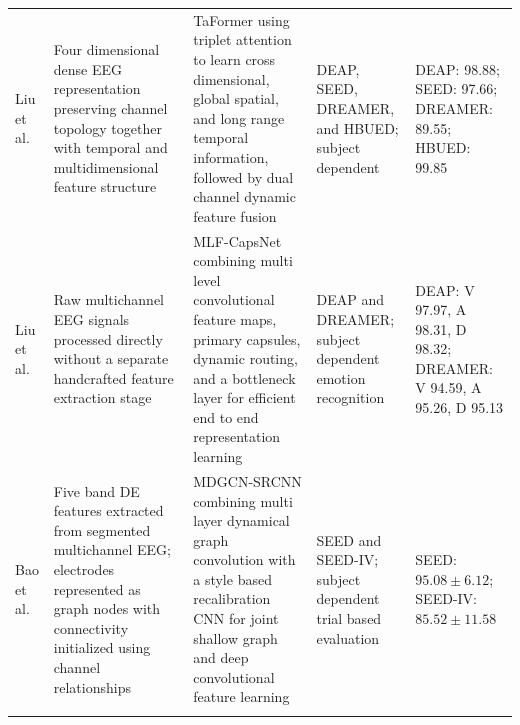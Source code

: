 \documentclass[ASNA,twocolumn]{USG}
\newcommand{\lightrowsep}{%
  \arrayrulecolor{lightrowgray}%
  \specialrule{0.30pt}{3.5pt}{3.5pt}%
  \arrayrulecolor{black}%
}
\begin{document}
\begin{table}
\begin{tabularx}{\textheight}{
>{\raggedright\arraybackslash}p{3.15cm}
>{\raggedright\arraybackslash}X
>{\raggedright\arraybackslash}X
>{\raggedright\arraybackslash}p{3.65cm}
>{\raggedright\arraybackslash}p{5.15cm}}
\lightrowsep

Liu et al. \cite{liu2026taformer} &
Four dimensional dense EEG representation preserving channel topology
together with temporal and multidimensional feature structure &
TaFormer using triplet attention to learn cross dimensional,
global spatial, and long range temporal information,
followed by dual channel dynamic feature fusion &
DEAP, SEED, DREAMER, and HBUED; subject dependent &
DEAP: 98.88;
SEED: 97.66;
DREAMER: 89.55;
HBUED: 99.85 \\

\lightrowsep

Liu et al. \cite{liu2020multi} &
Raw multichannel EEG signals processed directly without a separate
handcrafted feature extraction stage &
MLF-CapsNet combining multi level convolutional feature maps,
primary capsules, dynamic routing, and a bottleneck layer
for efficient end to end representation learning &
DEAP and DREAMER; subject dependent emotion recognition &
DEAP: V 97.97, A 98.31, D 98.32;
DREAMER: V 94.59, A 95.26, D 95.13 \\

\lightrowsep

Bao et al. \cite{bao2022linking} &
Five band DE features extracted from segmented multichannel EEG;
electrodes represented as graph nodes with connectivity initialized
using channel relationships &
MDGCN-SRCNN combining multi layer dynamical graph convolution with
a style based recalibration CNN for joint shallow graph
and deep convolutional feature learning &
SEED and SEED-IV; subject dependent trial based evaluation &
SEED: $95.08 \pm 6.12$;
SEED-IV: $85.52 \pm 11.58$ \\

\midrule
\multicolumn{5}{r}{\textit{Continued on next page}} \\
\bottomrule

\end{tabularx}
\end{table}
\end{document}
